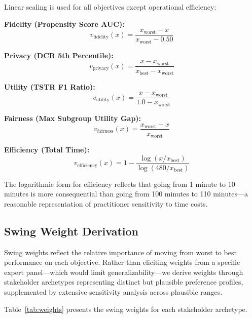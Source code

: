 \documentclass[12pt,a4paper]{article}
\begin{document}
Linear scaling is used for all objectives except operational efficiency:

\textbf{Fidelity (Propensity Score AUC):}
\begin{equation}
v_{\text{fidelity}}(x) = \frac{x_{\text{worst}} - x}{x_{\text{worst}} - 0.50}
\end{equation}

\textbf{Privacy (DCR 5th Percentile):}
\begin{equation}
v_{\text{privacy}}(x) = \frac{x - x_{\text{worst}}}{x_{\text{best}} - x_{\text{worst}}}
\end{equation}

\textbf{Utility (TSTR F1 Ratio):}
\begin{equation}
v_{\text{utility}}(x) = \frac{x - x_{\text{worst}}}{1.0 - x_{\text{worst}}}
\end{equation}

\textbf{Fairness (Max Subgroup Utility Gap):}
\begin{equation}
v_{\text{fairness}}(x) = \frac{x_{\text{worst}} - x}{x_{\text{worst}}}
\end{equation}

\textbf{Efficiency (Total Time):}
\begin{equation}
v_{\text{efficiency}}(x) = 1 - \frac{\log(x / x_{\text{best}})}{\log(480 / x_{\text{best}})}
\end{equation}

The logarithmic form for efficiency reflects that going from 1 minute to 10 minutes is more consequential than going from 100 minutes to 110 minutes---a reasonable representation of practitioner sensitivity to time costs.

\subsection{Swing Weight Derivation}

Swing weights reflect the relative importance of moving from worst to best performance on each objective. Rather than eliciting weights from a specific expert panel---which would limit generalizability---we derive weights through stakeholder archetypes representing distinct but plausible preference profiles, supplemented by extensive sensitivity analysis across plausible ranges.

Table~\ref{tab:weights} presents the swing weights for each stakeholder archetype.
\end{document}
